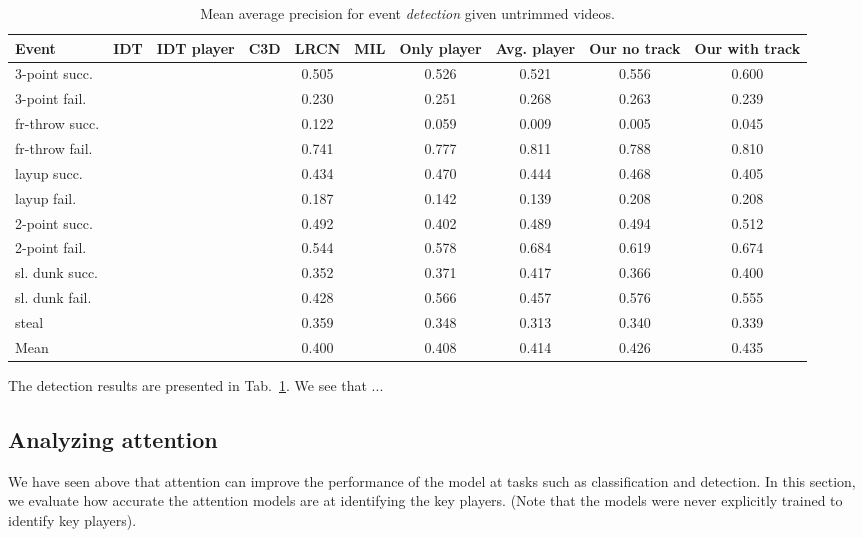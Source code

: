 \begin{table}[ht!]
\begin{center}
\small
 \begin{tabular}{|l|c|c|c|c|c|c|c|c|c|}
  \hline
Event & IDT\cite{Wang_CVPR11} & IDT player\cite{Wang_CVPR11} & C3D \cite{Tran_arxiv14} & LRCN \cite{Donahue_arxiv14} & MIL\cite{} & Only player & Avg. player & Our no track & Our with track \\ \hline \hline
3-point succ.  &  &  &  & 0.505 &  & 0.526 & 0.521 & 0.556 & 0.600 \\
3-point fail.  &  &  &  & 0.230 &  & 0.251 & 0.268 & 0.263 & 0.239 \\
fr-throw succ. &  &  &  & 0.122 &  & 0.059 & 0.009 & 0.005 & 0.045 \\
fr-throw fail. &  &  &  & 0.741 &  & 0.777 & 0.811 & 0.788 & 0.810 \\
layup succ.    &  &  &  & 0.434 &  & 0.470 & 0.444 & 0.468 & 0.405 \\
layup fail.    &  &  &  & 0.187 &  & 0.142 & 0.139 & 0.208 & 0.208 \\
2-point succ.  &  &  &  & 0.492 &  & 0.402 & 0.489 & 0.494 & 0.512 \\
2-point fail.  &  &  &  & 0.544 &  & 0.578 & 0.684 & 0.619 & 0.674 \\
sl. dunk succ. &  &  &  & 0.352 &  & 0.371 & 0.417 & 0.366 & 0.400 \\
sl. dunk fail. &  &  &  & 0.428 &  & 0.566 & 0.457 & 0.576 & 0.555 \\
steal          &  &  &  & 0.359 &  & 0.348 & 0.313 & 0.340 & 0.339 \\ \hline \hline
Mean             &  &  &  & 0.400 &  & 0.408 & 0.414 & 0.426 & 0.435 \\ \hline
  \end{tabular}
\end{center}
  \caption{Mean average precision for event {\em detection} given
    untrimmed videos.}
  \label{tab:detection_res}
\end{table}

 The detection results
are presented in Tab.~\ref{tab:detection_res}.
We see that  ...


\subsection{Analyzing attention}

We have seen above that attention can improve the performance of the model at tasks such as classification and detection.
In this section, we evaluate how accurate the attention models are at
identifying the key players. (Note that the models were never
explicitly trained to identify key players).

